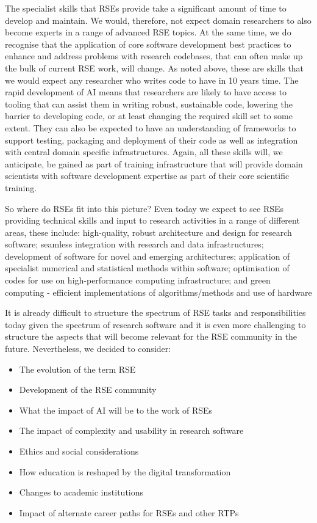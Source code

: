 \documentclass{eceasst}
\begin{document}
The specialist skills that RSEs provide take a significant amount of time to develop and maintain.
We would, therefore, not expect domain researchers to also become experts in a range of
advanced RSE topics. 
At the same time, we do recognise that the application of core software development best practices
to enhance and address problems with research codebases, that can often make up the bulk of
current RSE work, will change. As noted above, these are skills that we
would expect any researcher who writes code to have in 10 years time. 
The rapid development of AI means that researchers are likely to have access to tooling that can assist
them in writing robust, sustainable code, lowering the barrier to developing code, or at least changing the
required skill set to some extent.
They can also be expected to have an understanding of frameworks to support testing, packaging and
deployment of their code as well as integration with central domain specific infrastructures.
Again, all these skills will, we anticipate, be gained as part of training infrastructure that will
provide domain scientists with software development expertise as part of their core scientific training.

So where do RSEs fit into this picture? Even today we expect to see RSEs providing technical skills and input
to research activities in a range of different areas, these include:
high-quality, robust architecture and design for research software;
seamless integration with research and data infrastructures;
development of software for novel and emerging architectures;
application of specialist numerical and statistical methods within software;
optimisation of codes for use on high-performance computing infrastructure;
and green computing - efficient implementations of algorithms/methods and use of hardware

It is already difficult to structure the spectrum of RSE tasks and responsibilities today given the spectrum of research software \cite{hasselbring2024}
and it is even more challenging to structure the aspects that will become relevant for the RSE community in the future.
Nevertheless, we decided to consider:
\begin{itemize}
\item The evolution of the term RSE
\item Development of the RSE community
\item What the impact of AI will be to the work of RSEs
\item The impact of complexity and usability in research software
\item Ethics and social considerations
\item How education is reshaped by the digital transformation
\item Changes to academic institutions
\item Impact of alternate career paths for RSEs and other RTPs
\end{itemize}
\end{document}
